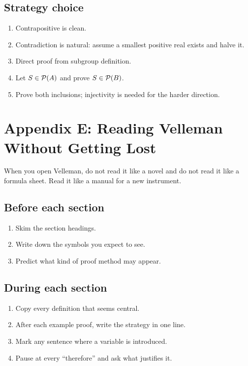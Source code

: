\documentclass[11pt]{article}
\begin{document}
\subsection{Strategy choice}

\begin{enumerate}
\item Contrapositive is clean.
\item Contradiction is natural: assume a smallest positive real exists and halve it.
\item Direct proof from subgroup definition.
\item Let $S\in\mathcal{P}(A)$ and prove $S\in\mathcal{P}(B)$.
\item Prove both inclusions; injectivity is needed for the harder direction.
\end{enumerate}

\newpage
\section{Appendix E: Reading Velleman Without Getting Lost}

When you open Velleman, do not read it like a novel and do not read it like a formula sheet. Read it like a manual for a new instrument.

\subsection{Before each section}

\begin{enumerate}
\item Skim the section headings.
\item Write down the symbols you expect to see.
\item Predict what kind of proof method may appear.
\end{enumerate}

\subsection{During each section}

\begin{enumerate}
\item Copy every definition that seems central.
\item After each example proof, write the strategy in one line.
\item Mark any sentence where a variable is introduced.
\item Pause at every ``therefore'' and ask what justifies it.
\end{enumerate}
\end{document}
